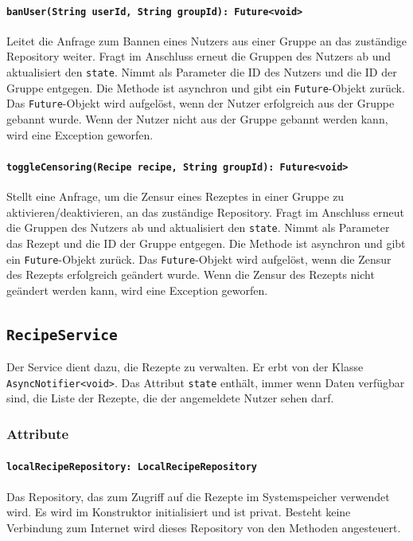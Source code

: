 \documentclass{entwurfsheft}
\begin{document}
\paragraph{\texttt{banUser(String userId, String groupId): Future<void>}}
Leitet die Anfrage zum Bannen eines Nutzers aus einer Gruppe an das zuständige Repository weiter. Fragt im Anschluss erneut die Gruppen des Nutzers ab und aktualisiert den \texttt{state}. Nimmt als Parameter die ID des Nutzers und die ID der Gruppe entgegen. Die Methode ist asynchron und gibt ein \texttt{Future}-Objekt zurück. Das \texttt{Future}-Objekt wird aufgelöst, wenn der Nutzer erfolgreich aus der Gruppe gebannt wurde. Wenn der Nutzer nicht aus der Gruppe gebannt werden kann, wird eine Exception geworfen.
\paragraph{\texttt{toggleCensoring(Recipe recipe, String groupId): Future<void>}}
Stellt eine Anfrage, um die Zensur eines Rezeptes in einer Gruppe zu aktivieren/deaktivieren, an das zuständige Repository. Fragt im Anschluss erneut die Gruppen des Nutzers ab und aktualisiert den \texttt{state}. Nimmt als Parameter das Rezept und die ID der Gruppe entgegen. Die Methode ist asynchron und gibt ein \texttt{Future}-Objekt zurück. Das \texttt{Future}-Objekt wird aufgelöst, wenn die Zensur des Rezepts erfolgreich geändert wurde. Wenn die Zensur des Rezepts nicht geändert werden kann, wird eine Exception geworfen.

\newpage
\subsection{\texttt{RecipeService}}\label{sec:RecipeService}
Der Service dient dazu, die Rezepte zu verwalten. Er erbt von der Klasse \texttt{AsyncNotifier<void>}. Das Attribut \texttt{state} enthält, immer wenn Daten verfügbar sind, die Liste der Rezepte, die der angemeldete Nutzer sehen darf.
\subsubsection*{Attribute}
\paragraph{\texttt{localRecipeRepository: LocalRecipeRepository}}
Das Repository, das zum Zugriff auf die Rezepte im Systemspeicher verwendet wird. Es wird im Konstruktor initialisiert und ist privat. Besteht keine Verbindung zum Internet wird dieses Repository von den Methoden angesteuert.
\end{document}
